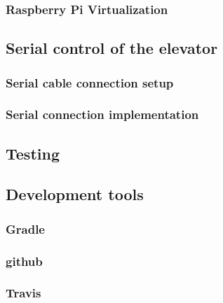 \documentclass[a4paper, 12pt]{article}
\begin{document}
\subsubsection{Raspberry Pi Virtualization}

\subsection{Serial control of the elevator}

\subsubsection{Serial cable connection setup}

\subsubsection{Serial connection implementation}

\subsection{Testing}

\subsection{Development tools}

\subsubsection{Gradle}

\subsubsection{github}

\subsubsection{Travis}



\end{document}
